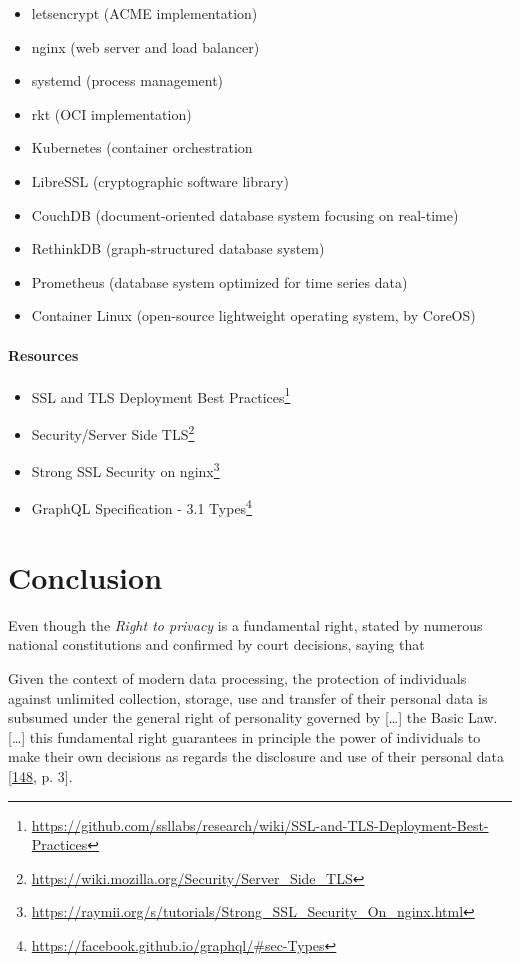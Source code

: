 \documentclass[12pt,english,a4paper,titlepage,cleardoublepage=empty,dottedtoc]{report}
\renewcommand{\href}[2]{#2\footnote{\url{#1}}}
\providecommand{\tightlist}{%
  \setlength{\itemsep}{0pt}\setlength{\parskip}{0pt}}
\let\origquote\quote
\let\endorigquote\endquote
\renewenvironment{quote}{%
    \origquote
    \itshape
}
{\endorigquote}
\begin{document}
\begin{itemize}
\tightlist
\item
  letsencrypt (ACME implementation)
\item
  nginx (web server and load balancer)
\item
  systemd (process management)
\item
  rkt (OCI implementation)
\item
  Kubernetes (container orchestration
\item
  LibreSSL (cryptographic software library)
\item
  CouchDB (document-oriented database system focusing on real-time)
\item
  RethinkDB (graph-structured database system)
\item
  Prometheus (database system optimized for time series data)
\item
  Container Linux (open-source lightweight operating system, by CoreOS)
\end{itemize}

\subsubsection*{Resources}\label{resources}

\begin{itemize}
\tightlist
\item
  \href{https://github.com/ssllabs/research/wiki/SSL-and-TLS-Deployment-Best-Practices}{SSL
  and TLS Deployment Best Practices}
\item
  \href{https://wiki.mozilla.org/Security/Server_Side_TLS}{Security/Server
  Side TLS}
\item
  \href{https://raymii.org/s/tutorials/Strong_SSL_Security_On_nginx.html}{Strong
  SSL Security on nginx}
\item
  \href{https://facebook.github.io/graphql/\#sec-Types}{GraphQL
  Specification - 3.1 Types}
\end{itemize}

\chapter{Conclusion}\label{conclusion}

Even though the \emph{Right to privacy} is a fundamental right, stated
by numerous national constitutions and confirmed by court decisions,
saying that

\begin{quote}
Given the context of modern data processing, the protection of
individuals against unlimited collection, storage, use and transfer of
their personal data is subsumed under the general right of personality
governed by {[}\ldots{}{]} the Basic Law. {[}\ldots{}{]} this
fundamental right guarantees in principle the power of individuals to
make their own decisions as regards the disclosure and use of their
personal data
{[}\protect\hyperlink{ref-court-decision_1983_census-act-germany}{148},
p. 3{]}.
\end{quote}
\end{document}

